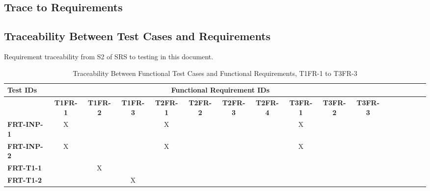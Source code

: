 \documentclass[12pt, titlepage]{article}
\begin{document}
\begin{landscape}
\section{Trace to Requirements}
		\subsection{Traceability Between Test Cases and Requirements}

		Requirement traceability from S2 of SRS to testing in this document.

		\begin{longtable}{|l|cccccccccccccccc|}
			\caption{Traceability Between Functional Test Cases and Functional Requirements, T1FR-1 to T3FR-3}                                                                                                                                                                                                                           \\
			\hline
			\textbf{Test IDs}   & \multicolumn{11}{c|}{\textbf{Functional Requirement IDs}}                                                                                                                                                                                                                                         \\
			\hline
			~                   & \textbf{T1FR-1}                                              & \textbf{T1FR-2} & \textbf{T1FR-3} & \textbf{T2FR-1} & \textbf{T2FR-2} & \textbf{T2FR-3} & \textbf{T2FR-4} & \textbf{T3FR-1} & \textbf{T3FR-2} & \textbf{T3FR-3}  \\
			\hline
   		\textbf{FRT-INP-1}  & X                                                         & ~            & ~            & X            & ~            & ~            & ~            & X            & ~            & ~             \\
        	\textbf{FRT-INP-2}  & X                                                         & ~            & ~            & X            & ~            & ~            & ~            & X            & ~            & ~             \\
			\textbf{FRT-T1-1}  & ~                                                         & X            & ~            & ~            & ~            & ~            & ~            & ~            & ~            & ~             \\
      	\textbf{FRT-T1-2}  & ~                                                         & ~            & X            & ~            & ~            & ~            & ~            & ~            & ~            & ~             \\

\end{longtable}
\end{landscape}
\end{document}
